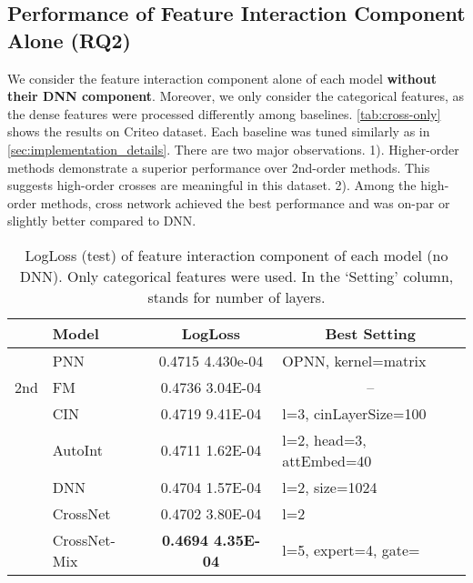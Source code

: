 \documentclass[sigconf]{acmart}
\begin{document}
\subsection{Performance of Feature Interaction Component Alone (RQ2)}
\label{sec:performance_feature_interaction}
We consider the feature interaction component alone of each model {\bf without their DNN component}. Moreover, we only consider the categorical features, as the dense features were processed differently among baselines. \autoref{tab:cross-only} shows the results on Criteo dataset. Each baseline was tuned similarly as in \autoref{sec:implementation_details}. There are two major observations. 1). Higher-order methods demonstrate a superior performance over 2nd-order methods. This suggests high-order crosses are meaningful in this dataset. 2). Among the high-order methods, cross network achieved the best performance and was on-par or slightly better compared to DNN.


\begin{table}[htpb]
\small
\caption{LogLoss (test) of feature interaction component of each model (no DNN). Only categorical features were used. In the `Setting' column,  stands for number of layers.}
\vspace{-2ex}
\label{tab:cross-only}
\begin{center}
\begin{tabular}{c|l|cl}
\toprule
& Model & LogLoss & \multicolumn{1}{c}{Best Setting}\\
\midrule
\multirow{ 3}{*}{2nd} 
&PNN \cite{qu2016product} &0.4715  4.430e-04 & OPNN, kernel=matrix\\
&FM      & 0.4736  3.04E-04& \multicolumn{1}{c}{--} \\
\midrule
\multirow{ 5}{*}{2} 
&CIN \cite{lian2018xdeepfm}  & 0.4719  9.41E-04& l=3, cinLayerSize=100\\
&AutoInt \cite{song2019autoint}   & 0.4711  1.62E-04& l=2, head=3, attEmbed=40\\
&DNN        & 0.4704  1.57E-04& l=2, size=1024\\
\cline{2-4}
&CrossNet     & 0.4702  3.80E-04& l=2\\
&CrossNet-Mix & \bf 0.4694  4.35E-04 & l=5, expert=4, gate=\\

\bottomrule
\end{tabular}
\end{center}
\end{table}
\end{document}
